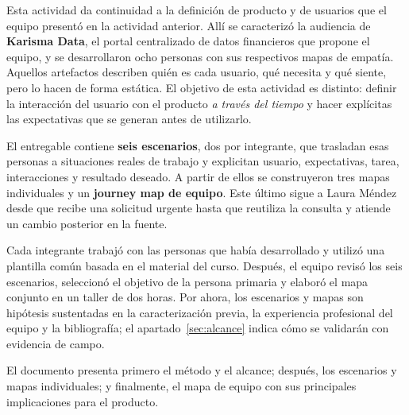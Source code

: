 
Esta actividad da continuidad a la definición de producto y de usuarios que el equipo
presentó en la actividad anterior. Allí se caracterizó la audiencia de \textbf{Karisma Data},
el portal centralizado de datos financieros que propone el equipo, y se desarrollaron ocho
personas con sus respectivos mapas de empatía. Aquellos artefactos describen quién es cada
usuario, qué necesita y qué siente, pero lo hacen de forma estática. El objetivo de esta
actividad es distinto: definir la interacción del usuario con el producto \emph{a través del
tiempo} y hacer explícitas las expectativas que se generan antes de utilizarlo.

El entregable contiene \textbf{seis escenarios}, dos por integrante, que trasladan esas
personas a situaciones reales de trabajo y explicitan usuario, expectativas, tarea,
interacciones y resultado deseado. A partir de ellos se construyeron tres mapas individuales
y un \textbf{journey map de equipo}. Este último sigue a Laura Méndez desde que recibe una
solicitud urgente hasta que reutiliza la consulta y atiende un cambio posterior en la fuente.

Cada integrante trabajó con las personas que había desarrollado y utilizó una plantilla
común basada en el material del curso. Después, el equipo revisó los seis escenarios,
seleccionó el objetivo de la persona primaria y elaboró el mapa conjunto en un taller de dos
horas. Por ahora, los escenarios y mapas son hipótesis sustentadas en la caracterización
previa, la experiencia profesional del equipo y la bibliografía; el apartado~\ref{sec:alcance}
indica cómo se validarán con evidencia de campo.

El documento presenta primero el método y el alcance; después, los escenarios y mapas
individuales; y finalmente, el mapa de equipo con sus principales implicaciones para el
producto.
